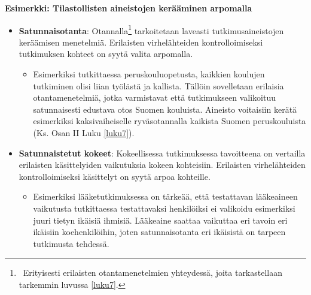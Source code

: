 \documentclass[
]{book}
\providecommand{\tightlist}{%
  \setlength{\itemsep}{0pt}\setlength{\parskip}{0pt}}
\begin{document}
\begin{eblock}{}

\textbf{Esimerkki: Tilastollisten aineistojen kerääminen arpomalla}

\begin{itemize}
\tightlist
\item
  \textbf{Satunnaisotanta}: Otannalla\footnote{~Erityisesti erilaisten otantamenetelmien yhteydessä, joita tarkastellaan tarkemmin luvussa \ref{luku7}.} tarkoitetaan laveasti tutkimusaineistojen keräämisen menetelmiä. Erilaisten virhelähteiden kontrolloimiseksi tutkimuksen kohteet on syytä valita arpomalla.

  \begin{itemize}
  \tightlist
  \item
    Esimerkiksi tutkittaessa peruskouluopetusta, kaikkien koulujen tutkiminen olisi liian työlästä ja kallista. Tällöin sovelletaan erilaisia otantamenetelmiä, jotka varmistavat että tutkimukseen valikoituu satunnaisesti edustava otos Suomen kouluista. Aineisto voitaisiin kerätä esimerkiksi kaksivaiheiselle ryväsotannalla kaikista Suomen peruskouluista (Ks. Osan II Luku \ref{luku7}).
  \end{itemize}
\item
  \textbf{Satunnaistetut kokeet}: Kokeellisessa tutkimuksessa tavoitteena on vertailla erilaisten käsittelyiden vaikutuksia kokeen kohteisiin. Erilaisten virhelähteiden kontrolloimiseksi käsittelyt on syytä arpoa kohteille.

  \begin{itemize}
  \tightlist
  \item
    Esimerkiksi lääketutkimuksessa on tärkeää, että testattavan lääkeaineen vaikutusta tutkittaessa testattavaksi henkilöiksi ei valikoidu esimerkiksi juuri tietyn ikäisiä ihmisiä. Lääkeaine saattaa vaikuttaa eri tavoin eri ikäisiin koehenkilöihin, joten satunnaisotanta eri ikäisistä on tarpeen tutkimusta tehdessä.
  \end{itemize}
\end{itemize}

\end{eblock}
\end{document}
